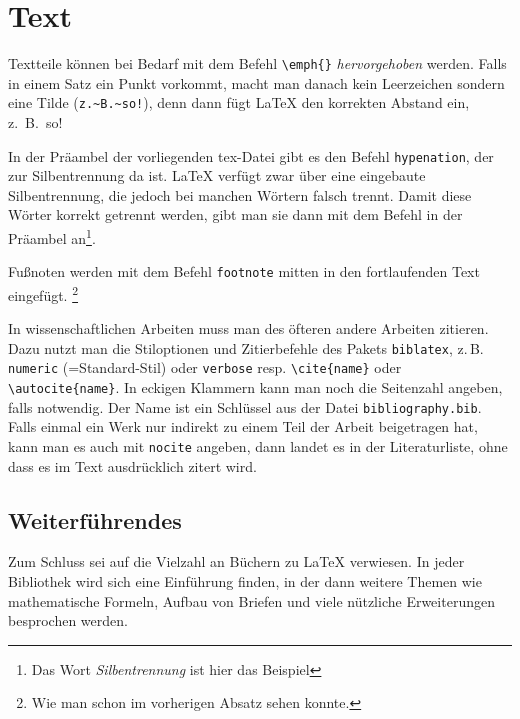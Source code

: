 \section{Text}

Textteile können bei Bedarf mit dem Befehl \verb|\emph{}| \emph{hervorgehoben} werden. Falls in einem Satz ein Punkt vorkommt, macht man danach kein Leerzeichen sondern eine Tilde (\verb|z.~B.~so!|), denn dann fügt \LaTeX{} den korrekten Abstand ein, z.~B.~so!


In der Präambel der vorliegenden tex-Datei gibt es den Befehl \verb|hypenation|, der zur Silbentrennung da ist. \LaTeX{} verfügt zwar über  eine eingebaute Silbentrennung, die jedoch bei manchen Wörtern falsch trennt. Damit diese Wörter korrekt getrennt werden, gibt man sie dann mit dem Befehl in der Präambel an\footnote{Das Wort \emph{Silbentrennung} ist hier das Beispiel}.

Fußnoten werden mit dem Befehl \verb|footnote| mitten in den fortlaufenden Text eingefügt. \footnote{Wie man schon im vorherigen Absatz sehen konnte.}

In wissenschaftlichen Arbeiten muss man des öfteren andere Arbeiten zitieren. Dazu nutzt man die Stiloptionen und Zitierbefehle des Pakets \verb+biblatex+, z.\,B.\,\verb|numeric| (=Standard-Stil) oder \verb|verbose| resp. \verb|\cite{name}| oder \verb|\autocite{name}|. In eckigen Klammern kann man noch die Seitenzahl angeben, falls notwendig. Der Name ist ein Schlüssel aus der Datei \verb|bibliography.bib|. Falls einmal ein Werk nur indirekt zu einem Teil der Arbeit beigetragen hat, kann man es auch mit \verb|nocite| angeben, dann landet es in der Literaturliste, ohne dass es im Text ausdrücklich zitert wird.


\subsection{Weiterführendes}

Zum Schluss sei auf die Vielzahl an Büchern zu \LaTeX{} verwiesen. In jeder Bibliothek wird sich eine Einführung finden, in der dann weitere Themen wie mathematische Formeln, Aufbau von Briefen und viele nützliche Erweiterungen besprochen werden.